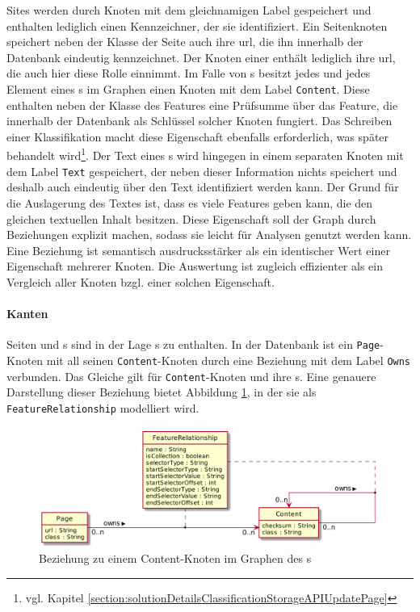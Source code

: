     Sites werden durch Knoten mit dem gleichnamigen Label gespeichert und enthalten lediglich einen
    Kennzeichner, der sie identifiziert.
    Ein Seitenknoten speichert neben der Klasse der Seite auch ihre \gls{url},
    die ihn innerhalb der Datenbank eindeutig kennzeichnet.
    Der Knoten einer {\resource} enthält lediglich ihre \gls{url}, die auch hier diese Rolle einnimmt.
    Im Falle von {\contentFeature}s besitzt jedes {\scalarFeature} und jedes Element eines {\collectionFeature}s
    im Graphen einen Knoten mit dem Label \texttt{Content}.
    Diese enthalten neben der Klasse des Features eine Prüfsumme über das Feature,
    die innerhalb der Datenbank als Schlüssel solcher Knoten fungiert.
    Das Schreiben einer Klassifikation macht diese Eigenschaft ebenfalls erforderlich,
    was später behandelt wird\footnote{vgl. Kapitel \ref{section:solutionDetailsClassificationStorageAPIUpdatePage}}.
    Der Text eines {\contentFeature}s wird hingegen in einem separaten Knoten mit dem Label \texttt{Text} gespeichert,
    der neben dieser Information nichts speichert und deshalb auch eindeutig über den Text identifiziert werden kann.
    Der Grund für die Auslagerung des Textes ist, dass es viele Features geben kann, die den gleichen textuellen Inhalt besitzen.
    Diese Eigenschaft soll der Graph durch Beziehungen explizit machen,
    sodass sie leicht für Analysen genutzt werden kann.
    Eine Beziehung ist semantisch ausdrucksstärker als ein identischer Wert einer Eigenschaft mehrerer Knoten.
    Die Auswertung ist zugleich effizienter als ein Vergleich aller Knoten bzgl. einer solchen Eigenschaft.

    \paragraph{Kanten}
    Seiten und {\contentFeature}s sind in der Lage {\contentFeature}s zu enthalten.
    In der Datenbank ist ein \texttt{Page}-Knoten mit all seinen \texttt{Content}-Knoten
    durch eine Beziehung mit dem Label \texttt{Owns} verbunden.
    Das Gleiche gilt für \texttt{Content}-Knoten und ihre {\childFeature}s.
    Eine genauere Darstellung dieser Beziehung bietet Abbildung \ref{image:dbDataModelContentRelationship},
    in der sie als \texttt{FeatureRelationship} modelliert wird.

    \begin{figure}
        \centering
        \includegraphics[scale=\imageScalingFactor]{../resources/db-data-model/content-relationship.png}
        \caption{Beziehung zu einem Content-Knoten im Graphen des {\classificationStorage}s}
        \label{image:dbDataModelContentRelationship}
    \end{figure}

